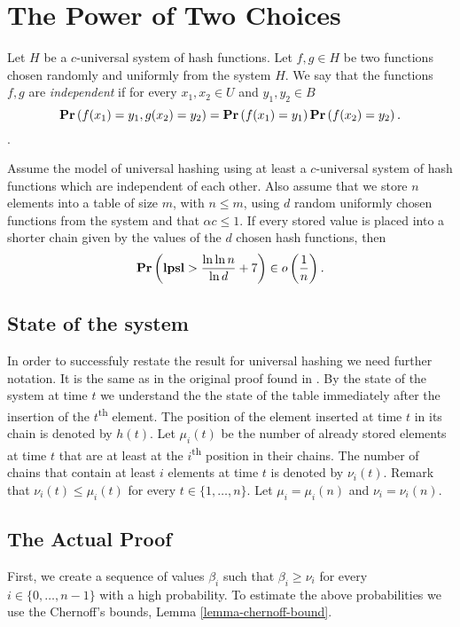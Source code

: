 \section{The Power of Two Choices}
\begin{definition}
\label{definition-independent-hash-functions}
Let $H$ be a $c$-universal system of hash functions. Let $f, g \in H$ be two functions chosen randomly and uniformly from the system $H$. We say that the functions $f, g$ are \emph{independent} if for every $x_1, x_2 \in U$ and $y_1, y_2 \in B$ $$\mathbf{Pr}\left(f(x_1) = y_1, g(x_2\right) = y_2) = \mathbf{Pr}\left(f(x_1) = y_1\right) \mathbf{Pr}\left(f(x_2) = y_2\right) \textit{.}$$.
\end{definition}


\begin{theorem}
\label{theorem-universal-hashing-two-choices}
Assume the model of universal hashing using at least a $c$-universal system of hash functions which are independent of each other. Also assume that we store $n$ elements into a table of size $m$, with $n \leq m$, using $d$ random uniformly chosen functions from the system and that $\alpha c \leq 1$. If every stored value is placed into a shorter chain given by the values of the $d$ chosen hash functions, then $$\mathbf{Pr}\left(\mathbf{lpsl} > \frac{\ln \ln n}{\ln d} + 7\right) \in o\left(\frac{1}{n}\right) \textit{.}$$
\end{theorem}

\subsection{State of the system}
In order to successfuly restate the result for universal hashing we need further notation. It is the same as in the original proof found in \cite{1076315}. 
By the state of the system at time $t$ we understand the the state of the table immediately after the insertion of the $t$\textsuperscript{th} element.
The position of the element inserted at time $t$ in its chain is denoted by $h(t)$. Let $\mu_i(t)$ be the number of already stored elements at time $t$ that are at least at the $i$\textsuperscript{th} position in their chains. The number of chains that contain at least $i$ elements at time $t$ is denoted by $\nu_i(t)$. Remark that $\nu_i(t) \leq \mu_i(t)$ for every $t \in \{1, \dots, n \}$. Let $\mu_i = \mu_i(n)$ and $\nu_i = \nu_i(n)$.

\subsection{The Actual Proof}
First, we create a sequence of values $\beta_i$ such that $\beta_i \geq \nu_i$ for every $i \in \{0, \dots, n - 1\}$ with a high probability. To estimate the above probabilities we use the Chernoff's bounds, Lemma \ref{lemma-chernoff-bound}.

